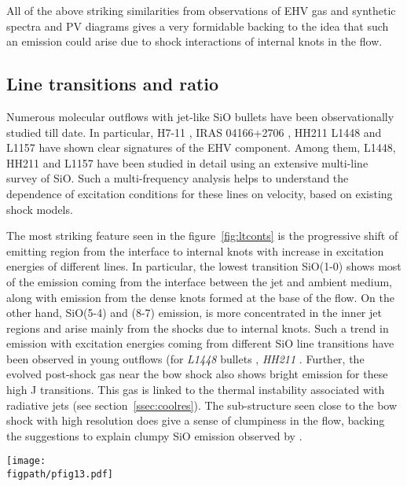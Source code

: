 \documentclass[useAMS,usenatbib]{mn2e}
\newcommand{\figpath}{../NEWFIGS}
\begin{document}
All of the above striking similarities from observations of EHV gas
and synthetic spectra and PV diagrams gives a very formidable backing
to the idea that such an emission could arise due to shock interactions of
internal knots in the flow. 

\subsection{Line transitions and ratio}
Numerous molecular outflows with jet-like SiO bullets have been
observationally studied till date. In particular, H7-11
\citep{Bachiller:1998p14725}, IRAS 04166+2706
\citep{SantiagoGarcia:2009p13972, Tafalla:2010p14759}, HH211 \citep{Nisini:2002p14418}
L1448 \citep{Bachiller:1991p14732,Nisini:2007p13128,
  Tafalla:2010p14759} and L1157 \citep{Nisini:2007p13128} have
shown clear signatures of the EHV component. Among them, L1448, HH211 and
L1157 have been studied in detail using an extensive multi-line
survey of SiO. Such a multi-frequency analysis helps to understand the dependence of
excitation conditions for these lines on velocity, based on existing shock
models.  
%

The most striking feature seen in the figure~\ref{fig:ltconts} is the progressive shift of
emitting region from the interface to internal knots with increase in
excitation energies of different lines. In particular, the lowest
transition SiO(1-0) shows most of the emission coming from the
interface between the jet and ambient medium, along with emission from
the dense knots formed at the base of the flow. On the other hand, SiO(5-4) and (8-7) emission, 
is more concentrated in the inner jet regions and arise mainly from
the shocks due to internal knots. Such a trend in emission with excitation energies coming from different SiO line transitions
have been observed in young outflows (for {\it{L1448}}
bullets \citep{Nisini:2007p13128}, {\it{HH211}}
\citep{Chandler:2001p14376, Nisini:2002p14418,
  Hirano:2006p14411}. Further, the evolved post-shock gas near the
bow shock also shows bright emission for these high J transitions. 
This gas is linked to the thermal instability associated with
radiative jets (see section~\ref{ssec:coolres}). The sub-structure seen close to the
bow shock with high resolution does give a sense of clumpiness
in the flow, backing the suggestions to explain clumpy SiO emission 
observed by \cite{Chandler:2001p14376}.
%

\begin{figure*}
 \texttt{[image: \\figpath/pfig13.pdf]}%
 \caption{Contour maps of multi-line integrated SiO
   emission convolved with a 2\arcsec\,beam obtained using parameters
   of the reference run. The line transitions are labelled on the top
   left corner of each panel. The contour colors represent different intensities in K-km\,s$^{-1}$, i.e, 50.0({\it red}), 30.0({\it green}), 20.0({\it blue}), 5.0({\it
     magenta}), 2.0({\it cyan}), 0.1({\it black}).} 
\label{fig:ltconts}
\end{figure*}
\end{document}
